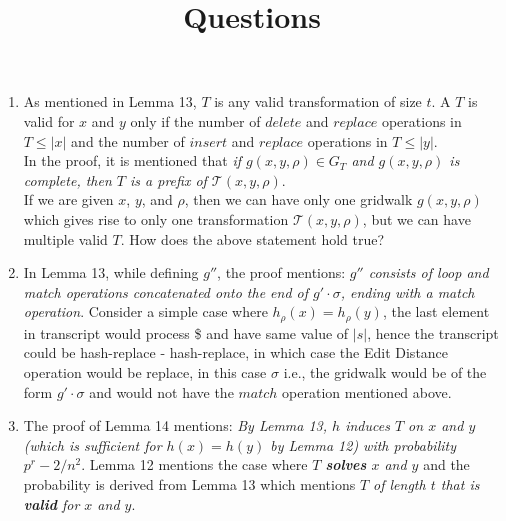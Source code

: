 \documentclass{article}
\title{Questions}
\author{}
\date{}
\begin{document}
\maketitle

\begin{enumerate}
    \item As mentioned in Lemma 13, $T$ is any valid transformation of size $t$.
    A $T$ is valid for $x$ and $y$ only 
    if the number of $delete$ and $replace$ operations in $T\leq|x|$ and the 
    number of $insert$ and $replace$ operations in $T\leq|y|$.\\
    In the proof, it is mentioned that \textit{if $g(x,y,\rho)\in G_T$ and 
    $g(x,y,\rho)$ is complete, then $T$ is a prefix of $\mathcal{T}(x,y,\rho)$}.\\
    If we are given $x$, $y$, and $\rho$, then we can have only one gridwalk
    $g(x,y,\rho)$ which gives rise to only one transformation $\mathcal{T}(x,y,\rho)$,
    but we can have multiple valid $T$. How does the above statement hold true?

    \item In Lemma 13,
    while defining $g''$, the proof mentions: \textit{$g''$ consists of 
    loop and match operations concatenated onto the end of $g'\cdot\sigma$,
    ending with a match operation}. Consider a simple case where $h_\rho(x)=h_\rho(y)$,
    the last element in transcript would process \$ and have same value of $|s|$,
    hence the transcript could be hash-replace - hash-replace, in which case
    the Edit Distance operation would be replace, in this case $\sigma$ i.e.,
    the gridwalk would be of the form $g'\cdot\sigma$ and would not have the 
    $match$ operation mentioned above.

    \item The proof of Lemma 14 mentions: \textit{By Lemma 13, $h$ induces $T$ 
    on $x$ and $y$ (which is sufficient for $h(x)=h(y)$ by Lemma 12) with
    probability $p^r-2/n^2$}. Lemma 12 mentions the case where \textit{$T$ 
    \textbf{solves} $x$ and $y$} and the probability is derived from Lemma 13
    which mentions \textit{$T$ of length $t$ that is \textbf{valid} for $x$ 
    and $y$}.
\end{enumerate}



\end{document}
